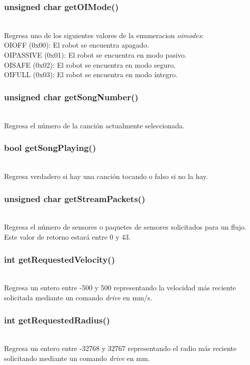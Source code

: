 \documentclass[letterpaper]{book}
\begin{document}
\subsubsection{unsigned char getOIMode()}\mbox{}\\
Regresa uno de los siguientes valores de la enumeracion \emph{oimodes}:\\
OIOFF (0x00): El robot se encuentra apagado.\\
OIPASSIVE (0x01): El robot se encuentra en modo pasivo.\\
OISAFE (0x02): El robot se encuentra en modo seguro.\\
OIFULL (0x03): El robot se encuentra en modo íntegro.\\
\subsubsection{unsigned char getSongNumber()}\mbox{}\\
Regresa el número de la canción actualmente seleccionada.\\
\subsubsection{bool getSongPlaying()}\mbox{}\\
Regresa verdadero si hay una canción tocando o falso si no la hay.\\
\subsubsection{unsigned char getStreamPackets()}\mbox{}\\
Regresa el número de sensores o paquetes de sensores solicitados para un flujo. Este valor de retorno estará entre 0 y 43.\\
\subsubsection{int getRequestedVelocity()}\mbox{}\\
Regresa un entero entre -500 y 500 representando la velocidad más reciente solicitada mediante un comando \emph{drive} en mm/s.\\
\subsubsection{int getRequestedRadius()}\mbox{}\\
Regresa un entero entre -32768 y 32767 representando el radio más reciente solicitando mediante un comando \emph{drive} en mm.\\
\end{document}
